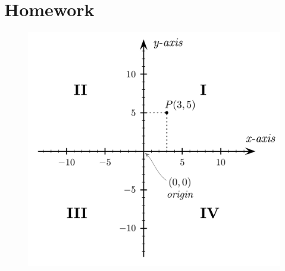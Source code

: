 \documentclass{article}
\begin{document}
		\section{Homework}
			\begin{figure} %
				\includegraphics[scale=0.1]{Grid_Quads.jpg}
			\end{figure}
\end{document}
